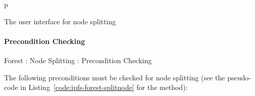 \begin{stusubfig}{p}
	\hspace{8mm}%
	\hspace{8mm}%
\caption{The user interface for node splitting}
\label{fig:ipfs-forest-nodesplitting-gui}
\end{stusubfig}

\paragraph{Precondition Checking}

\begin{stulisting}[t]
\caption{Forest : Node Splitting : Precondition Checking}
\label{code:ipfs-forest-splitnode}

\end{stulisting}

The following preconditions must be checked for node splitting (see the pseudo-code in Listing~\ref{code:ipfs-forest-splitnode} for the method):

